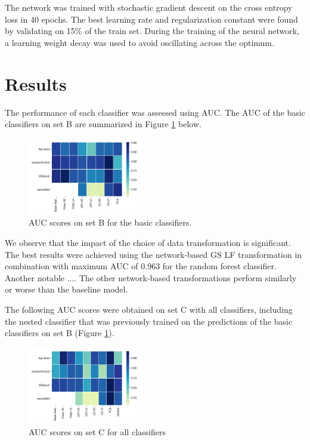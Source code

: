 \documentclass[10pt,conference,compsocconf]{IEEEtran}
\begin{document}
The network was trained with stochastic gradient descent on the cross entropy loss in 40 epochs. The best learning rate and regularization constant were found by validating on 15\% of the train set. During the training of the neural network, a learning weight decay was used to avoid oscillating across the optimum.

\section*{Results}
The performance of each classifier was assessed using AUC.
The AUC of the basic classifiers on set B are summarized in Figure \ref{fig:train_acc} below.
\begin{figure}[H]
	\centering
	\includegraphics[width=0.45\textwidth]{train_auc.png}
	\caption{AUC scores on set B for the basic classifiers.}
	\label{fig:train_acc}
\end{figure}
We observe that the impact of the choice of data transformation is significant.
The best results were achieved using the network-based GS LF transformation in combination  with maximum AUC of 0.963 for the random forest classifier. Another notable .... The other network-based transformations perform similarly or worse than the baseline model. 
\par  
The following AUC scores were obtained on set C with all classifiers, including the nested classifier that was previously trained on the predictions of the basic classifiers on set B (Figure \ref{fig:train_acc}).

\begin{figure}[H]
	\centering
	\includegraphics[width=0.45\textwidth]{test_auc.png}
	\caption{AUC scores on set C for all classifiers }
	\label{fig:test_acc}
\end{figure}
\end{document}
